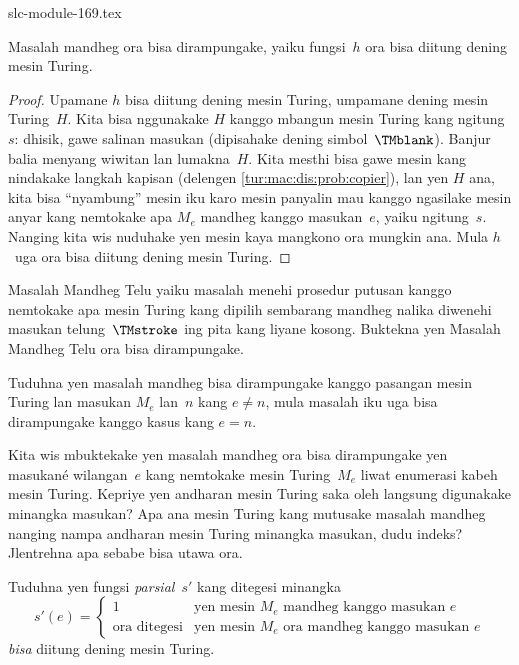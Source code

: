\begin{filecontents*}[overwrite]{slc-module-169.tex}
\begin{thm}
 Masalah mandheg ora bisa
dirampungake, yaiku fungsi~$h$ ora bisa diitung
dening mesin Turing.
\end{thm}

\begin{proof}
Upamane $h$ bisa diitung dening mesin Turing,
umpamane dening mesin Turing~$H$. Kita bisa
nggunakake $H$ kanggo mbangun mesin Turing
kang ngitung~$s$: dhisik, gawe salinan masukan
(dipisahake dening simbol~$\TMblank$). Banjur
balia menyang wiwitan lan lumakna~$H$.
Kita mesthi bisa gawe mesin kang nindakake
langkah kapisan (delengen
\cref{tur:mac:dis:prob:copier}), lan yen $H$
ana, kita bisa ``nyambung'' mesin iku
karo mesin panyalin mau kanggo ngasilake
mesin anyar kang nemtokake apa $M_e$
mandheg kanggo masukan~$e$, yaiku ngitung~$s$.
Nanging kita wis nuduhake yen mesin kaya
mangkono ora mungkin ana. Mula $h$~uga
ora bisa diitung dening mesin Turing.
\end{proof}

\begin{prob}
Masalah Mandheg Telu yaiku masalah
menehi prosedur putusan kanggo nemtokake apa
mesin Turing kang dipilih sembarang mandheg
nalika diwenehi masukan telung~$\TMstroke$
ing pita kang liyane kosong. Buktekna
yen Masalah Mandheg Telu ora bisa dirampungake.
\end{prob}

\begin{prob}
Tuduhna yen masalah mandheg bisa dirampungake
kanggo pasangan mesin Turing lan masukan $M_e$
lan~$n$ kang $e \neq n$, mula masalah iku
uga bisa dirampungake kanggo kasus kang
$e = n$.
\end{prob}

\begin{prob}
Kita wis mbuktekake yen masalah mandheg
ora bisa dirampungake yen masukané wilangan~$e$
kang nemtokake mesin Turing~$M_e$ liwat
enumerasi kabeh mesin Turing. Kepriye yen
andharan mesin Turing saka
 oleh langsung
digunakake minangka masukan? Apa ana mesin
Turing kang mutusake masalah mandheg nanging
nampa andharan mesin Turing minangka masukan,
dudu indeks? Jlentrehna apa sebabe bisa
utawa ora.
\end{prob}

\begin{prob} Tuduhna yen fungsi \emph{parsial}~$s'$ kang ditegesi minangka
  \[
  s'(e) =
  \begin{cases}
    \text{1} & \text{yen mesin~$M_e$ mandheg kanggo masukan $e$}\\
    \text{ora ditegesi} & \text{yen mesin~$M_e$ ora mandheg kanggo masukan $e$}
  \end{cases}
  \]
  \emph{bisa} diitung dening mesin Turing.
\end{prob}


\end{filecontents*}

